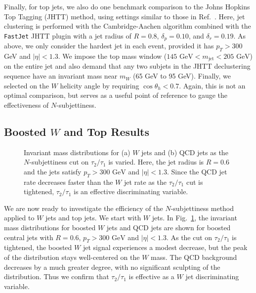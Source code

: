 \documentclass{JHEP3}
\newcommand{\vsh}{\vspace{-.5cm}}
\DeclareRobustCommand{\Fig}[1]{Fig.~\ref{#1}}
\DeclareRobustCommand{\Ref}[1]{Ref.~\cite{#1}}
\begin{document}
Finally, for top jets, we also do one benchmark comparison to the Johns Hopkins Top Tagging (JHTT) method, using settings similar to those in \Ref{Kaplan:2008ie}.  Here, jet clustering is performed with the Cambridge-Aachen algorithm \cite{Dokshitzer:1997in,Wobisch:1998wt} combined with the \texttt{FastJet} JHTT plugin \cite{FastJet} with a jet radius of $R = 0.8$, $\delta_p = 0.10$, and $\delta_r = 0.19$.  As above, we only consider the hardest jet in each event, provided it has $p_T > 300$ GeV and $|\eta| < 1.3$.  We impose the top mass window ($145 \text{ GeV} < m_{\text{jet}} < 205 \text{ GeV}$) on the entire jet and also demand that any two subjets in the JHTT declustering sequence have an invariant mass near $m_W$ (65 GeV to 95 GeV).  Finally, we selected on the $W$ helicity angle by requiring $\cos\theta_h < 0.7$.  Again, this is not an optimal comparison, but serves as a useful point of reference to gauge the effectiveness of $N$-subjettiness.

\clearpage

\subsection{Boosted $W$ and Top Results}
\label{sec:efficiencyt}

\begin{figure}[tp]
  \begin{center}
  \end{center}
  \vsh
  \caption{Invariant mass distributions for (a) $W$ jets and (b) QCD jets as the $N$-subjettiness cut on $\tau_2/\tau_1$ is varied.   Here, the jet radius is $R=0.6$ and the jets satisfy $p_T > 300 \text{ GeV}$ and $|\eta| < 1.3$.  Since the QCD jet rate decreases faster than the $W$ jet rate as the $\tau_2/\tau_1$ cut is tightened, $\tau_2/\tau_1$ is an effective discriminating variable.}
  \label{fig:WInvM}
\end{figure}

We are now ready to investigate the efficiency of the $N$-subjettiness method applied to $W$ jets and top jets.  We start with $W$ jets.  In \Fig{fig:WInvM}, the invariant mass distributions for boosted $W$ jets and QCD jets are shown for boosted central jets with $R = 0.6$, $p_T > 300 \text{ GeV}$ and $|\eta| < 1.3$.  As the cut on $\tau_2/\tau_1$ is tightened, the boosted $W$ jet signal experiences a modest decrease, but the peak of the distribution stays well-centered on the $W$ mass.  The QCD background decreases by a much greater degree, with no significant sculpting of the distribution.  Thus we confirm that $\tau_2/\tau_1$ is effective as a $W$ jet discriminating variable.
\end{document}
